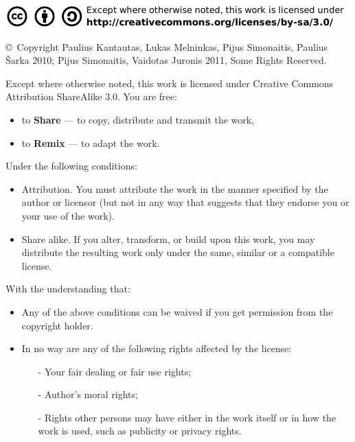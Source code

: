 
\newpage
\thispagestyle{empty}
{\flushleft
\includegraphics[scale=1.75]{./iliustracijos/kitos/ccbysa.pdf}}
  \medskip

  \begin{small} 
    \noindent \copyright \ Copyright Paulius Kantautas, Lukas Melninkas,
    Pijus Simonaitis, Paulius Šarka 2010; Pijus Simonaitis, Vaidotas
    Juronis 2011, Some Rights Reserved. \\ \bigskip

    \noindent Except where otherwise noted, this work is licensed under Creative Commons
    Attribution ShareAlike 3.0. You are free:
    \begin{itemize}
      \item to \textbf{Share} — to copy, distribute and transmit the work,
      \item to \textbf{Remix} — to adapt the work.
    \end{itemize}

    \noindent Under the following conditions:
    \begin{itemize}
      \item Attribution. You must attribute the work in the manner specified by
	the author or licensor (but not in any way that suggests that they
	endorse you or your use of the work).
      \item Share alike. If you alter, transform, or build upon this work, you
	may distribute the resulting work only under the same, similar or a
	compatible license.
    \end{itemize}

    \noindent With the understanding that:

    \begin{itemize}
      \item Any of the above conditions can be waived if you get permission
	from the copyright holder.
      \item In no way are any of the following rights affected by the license:
	\begin{itemize}
	  \item[-] Your fair dealing or fair use rights;
	  \item[-] Author's moral rights;
	  \item[-] Rights other persons may have either in the work itself or in
	    how the work is used, such as publicity or privacy rights.
	\end{itemize}
    \end{itemize}

  \end{small}


%

%
